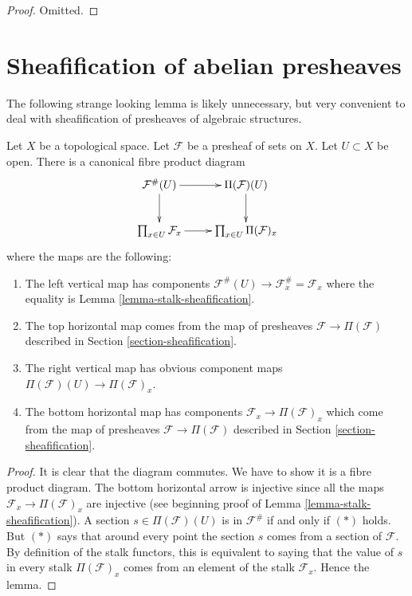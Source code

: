 \begin{proof}
Omitted.
\end{proof}


\section{Sheafification of abelian presheaves}
\label{section-sheafify-abelian-presheaves}

\noindent
The following strange looking lemma is likely unnecessary, but
very convenient to deal with sheafification of presheaves
of algebraic structures.

\begin{lemma}
\label{lemma-diagram-fibre-product}
Let $X$ be a topological space. Let $\mathcal{F}$ be
a presheaf of sets on $X$. Let $U \subset X$ be open.
There is a canonical fibre product diagram
$$
\xymatrix{
\mathcal{F}^\#(U) \ar[d] \ar[r] &
\Pi(\mathcal{F})(U) \ar[d] \\
\prod_{x \in U} \mathcal{F}_x
\ar[r] &
\prod_{x \in U} \Pi(\mathcal{F})_x
}
$$
where the maps are the following:
\begin{enumerate}
\item The left vertical map has components
$\mathcal{F}^\#(U) \to \mathcal{F}^\#_x = \mathcal{F}_x$
where the equality is Lemma \ref{lemma-stalk-sheafification}.
\item The top horizontal map comes from the
map of presheaves $\mathcal{F} \to \Pi(\mathcal{F})$ described
in Section \ref{section-sheafification}.
\item The right vertical map has obvious component
maps $\Pi(\mathcal{F})(U) \to \Pi(\mathcal{F})_x$.
\item The bottom horizontal map has components
$\mathcal{F}_x \to \Pi(\mathcal{F})_x$
which come from the map of presheaves
$\mathcal{F} \to \Pi(\mathcal{F})$ described
in Section \ref{section-sheafification}.
\end{enumerate}
\end{lemma}

\begin{proof}
It is clear that the diagram commutes. We have to show
it is a fibre product diagram. The bottom horizontal arrow
is injective since all the maps $\mathcal{F}_x \to \Pi(\mathcal{F})_x$
are injective (see beginning proof of
Lemma \ref{lemma-stalk-sheafification}).
A section $s \in \Pi(\mathcal{F})(U)$ is in $\mathcal{F}^\#$ if and
only if $(*)$ holds. But $(*)$ says that around every point
the section $s$ comes from a section of $\mathcal{F}$. By definition
of the stalk functors, this is equivalent to saying that
the value of $s$ in every stalk $\Pi(\mathcal{F})_x$ comes
from an element of the stalk $\mathcal{F}_x$. Hence the lemma.
\end{proof}


